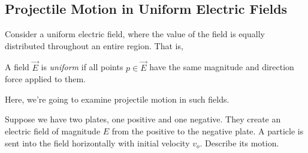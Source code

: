 \documentclass[11pt]{article}
\begin{document}
\subsection{Projectile Motion in Uniform Electric Fields}
Consider a uniform electric field, where the value of the field is equally distributed throughout an entire region. That is,
\begin{defn}
	A field $\vec{E}$ is \textit{uniform} if all points $p \in \vec{E}$ have the same magnitude and direction force applied to them.	
\end{defn}
Here, we're going to examine projectile motion in such fields.
\begin{example}\label{projectilefieldex1}
	Suppose we have two plates, one positive and one negative. They create an electric field of magnitude $E$ from the positive to the negative plate. A particle is sent into the field horizontally with initial velocity $v_o$. Describe its motion.	
\end{example}
\end{document}
